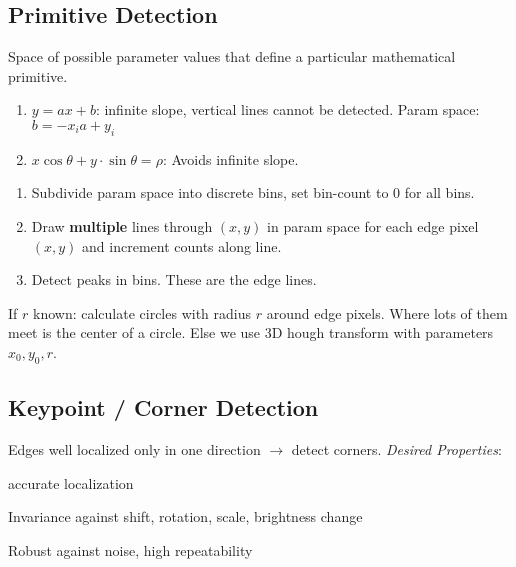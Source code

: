 \subsection{Primitive Detection}

\begin{definition}
  Space of possible parameter values that define a particular mathematical primitive.
\end{definition}

\begin{definition}
  \begin{enumerate}
    \item \(y = ax + b\): infinite slope, vertical lines cannot be detected. Param space: \(b = -x_i a + y_i\)
    \item \(x \cos \theta + y \cdot \sin \theta = \rho\): Avoids infinite slope.
  \end{enumerate}
\end{definition}

\begin{algorithm}
  \begin{enumerate}
    \item Subdivide param space into discrete bins, set bin-count to 0 for all bins.
    \item Draw \textbf{multiple} lines through \((x, y)\) in param space for each edge pixel \((x, y)\) and increment counts along line.
    \item Detect peaks in bins. These are the edge lines.
  \end{enumerate}
\end{algorithm}

\begin{definition}
  If \(r\) known: calculate circles with radius \(r\) around edge pixels. Where lots of them meet is the center of a circle. Else we use 3D hough transform with parameters \(x_0, y_0, r\).
\end{definition}

\subsection{Keypoint / Corner Detection}
Edges well localized only in one direction \(\to\) detect corners.
\textit{Desired Properties}:
\begin{itemize*}
  \item accurate localization
  \item Invariance against shift, rotation, scale, brightness change
  \item Robust against noise, high repeatability
\end{itemize*}

